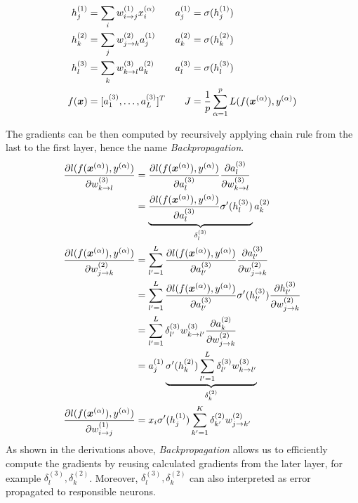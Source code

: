 \begin{align*}
		h_j^{(1)} &= \sum_i w_{i \rightarrow j}^{(1)} x_i^{(\alpha)} & a_j^{(1)} &= \sigma (h_j^{(1)})	\\
		h_k^{(2)} &= \sum_j w_{j \rightarrow k}^{(2)} a_j^{(1)}  & a_k^{(2)} &= \sigma (h_k^{(2)})	 \\
		h_l^{(3)} &= \sum_k w_{k \rightarrow l}^{(3)} a_k^{(2)} & a_l^{(3)} &= \sigma (h_l^{(3)})	 \\
		f(\x) &= [ a_1^{(3)}, \dots, a_L^{(3)}  ]^T  & J &= \frac{1}{p} \sum_{\alpha = 1}^{p} L(f(\xa), \ya)	
\end{align*}

The gradients can be then computed by recursively applying chain rule from the last to the first layer, hence the name \textit{Backpropagation}.
\begin{align}
	\frac{\partial l(f(\xa), \ya)  }{\partial w_{k \rightarrow l}^{(3)} } &= 	\frac{\partial l(f(\xa), \ya) }{\partial a_{l}^{(3)} }  \frac{\partial a_{l}^{(3)} }{\partial w_{k \rightarrow l}^{(3)} }  	\\
		&= 	\underbrace{\frac{\partial l(f(\xa), \ya) }{\partial a_{l}^{(3)} } \sigma'(h_l^{(3)})}_{ \delta_l^{(3)}} a_{k}^{(2)} 	\\
	\frac{\partial l(f(\xa), \ya)  }{\partial w_{j \rightarrow k}^{(2)} } 
		&=  \sum_{l' = 1}^{L} 	\frac{\partial l(f(\xa), \ya) }{\partial a_{l'}^{(3)} } \frac{\partial a_{l'}^{(3)}}{\partial w_{j \rightarrow k}^{(2)}} \\
		&= \sum_{l' = 1}^{L} 	\frac{\partial l(f(\xa), \ya) }{\partial a_{l'}^{(3)} } \sigma'(h_{l'}^{(3)})  \frac{\partial h_{l'}^{(3)} }{\partial w_{j \rightarrow k}^{(2)}} \\
		&= \sum_{l' = 1}^{L} 	\delta_{l'}^{(3)}  w_{k \rightarrow l'}^{(3)} \frac{\partial a_{k}^{(2)} }{\partial w_{j \rightarrow k}^{(2)}} \\
		&= a_{j}^{(1)}  \underbrace{\sigma'(h_{k}^{(2)}) \sum_{l' = 1}^{L} 	\delta_{l'}^{(3)} w_{k \rightarrow l'}^{(3)}}_{\delta_{k}^{(2)}}  \\
	\frac{\partial l(f(\xa), \ya)  }{\partial w_{i \rightarrow j}^{(1)} } &=  x_i  \sigma'(h_{j}^{(1)}) \sum_{k' = 1}^{K} 	\delta_{k'}^{(2)} w_{j \rightarrow k'}^{(2)} 
\end{align}
As shown in the derivations above, \textit{Backpropagation} allows us to efficiently compute the gradients by reusing calculated gradients from the later layer, for example $\delta_l^{(3)}, 	\delta_{k}^{(2)}$. Moreover, $\delta_l^{(3)}, 	\delta_{k}^{(2)}$ can also interpreted as error propagated to responsible neurons.

